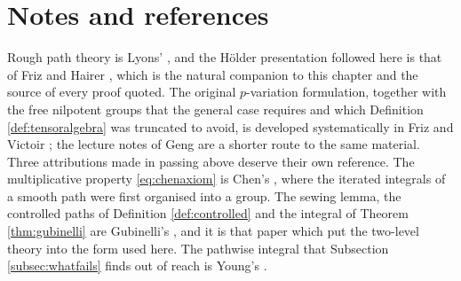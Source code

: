 


\section*{Notes and references}

\noindent
Rough path theory is Lyons' \cite{lyons1998}, and the Hölder presentation followed here is that of
Friz and Hairer \cite{frizhairer2020}, which is the natural companion to this chapter and the source
of every proof quoted. The original $p$-variation formulation, together with the
free nilpotent groups that the general case requires and which Definition \ref{def:tensoralgebra}
was truncated to avoid, is developed systematically in Friz and Victoir \cite{frizvictoir2010}; the
lecture notes of Geng \cite{geng2021} are a shorter route to the same material. Three attributions
made in passing above deserve their own reference. The multiplicative property \eqref{eq:chenaxiom}
is Chen's \cite{chen1957}, where the iterated integrals of a smooth path were first organised into a
group. The sewing lemma, the controlled paths of Definition \ref{def:controlled} and the integral of
Theorem \ref{thm:gubinelli} are Gubinelli's \cite{gubinelli2004}, and it is that paper which put the
two-level theory into the form used here. The pathwise integral that Subsection
\ref{subsec:whatfails} finds out of reach is Young's \cite{young1936}.

\medskip

